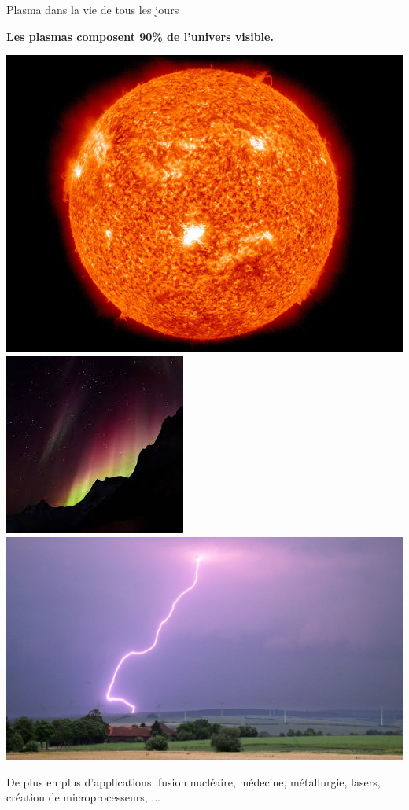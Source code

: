 \documentclass[24pt,t,table, aspectratio=169]{beamer}
\begin{document}
\begin{frame}{Plasma dans la vie de tous les jours}

\begin{framed}
\centering
\textbf{Les plasmas composent 90\% de l'univers visible.}
\end{framed}
\begin{center}
\includegraphics[height=.22\linewidth]{./sun.jpg}
\includegraphics[height=.22\linewidth]{./aurora_borealis.jpeg}
\includegraphics[height=.22\linewidth]{./lightning.jpg}
\end{center}
De plus en plus d'applications: fusion nucléaire, médecine, métallurgie, lasers, création de microprocesseurs, ...
\end{frame}
\end{document}
